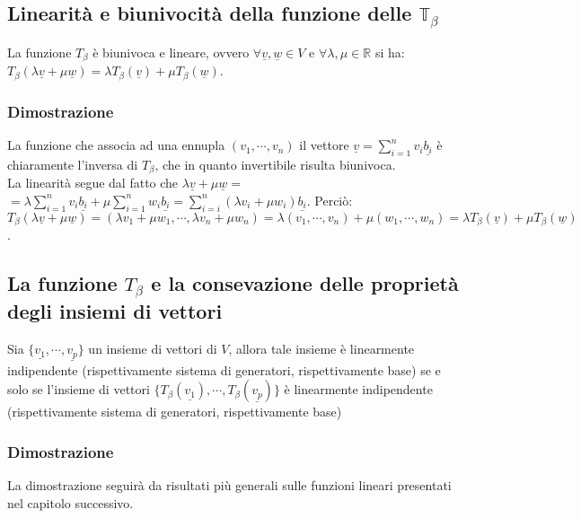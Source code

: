 \subsection{Linearit\`a e biunivocit\`a della funzione delle $\mathbb{T_\beta}$}
La funzione $T_\beta$ \`e biunivoca e lineare, ovvero $\forall\underline{v},\underline{w}\in V$ e $\forall\lambda,\mu\in\mathbb{R}$ si ha: $T_\beta(\lambda\underline{v}+\mu
\underline{w})=\lambda T_\beta(\underline{v})+\mu T_\beta(\underline{w})$. 
\subsubsection{Dimostrazione}
La funzione che associa ad una ennupla $(v_1,\cdots,v_n)$ il vettore $\underline{v}=\sum\limits_{i=1}^n v_i\underline{b_i}$ \`e chiaramente l'inversa di $T_\beta$, che in quanto
invertibile risulta biunivoca.\\
La linearit\`a segue dal fatto che $\lambda\underline{v}+\mu\underline{w}=$\\
$=\lambda\sum\limits_{i=1}^nv_i\underline{b_i}+\mu\sum\limits_{i=1}^nw_i\underline{b_i}=\sum\limits_{i=i}^n(\lambda v_i+\mu w_i)\underline{b_i}$. Perci\`o:\\
$T_\beta(\lambda \underline{v}+\mu\underline{w})=(\lambda v_1+\mu w_1,\cdots,\lambda v_n+\mu w_n)=\lambda(v_1,\cdots,v_n)+\mu(w_1,\cdots,w_n)=\lambda T_\beta(\underline{v})+\mu 
T_\beta(\underline{w})$.
\subsection{La funzione $T_\beta$ e la consevazione delle propriet\`a degli insiemi di vettori}
Sia $\{\underline{v_1},\cdots,\underline{v_p}\}$ un insieme di vettori di $V$, allora tale insieme \`e linearmente indipendente (rispettivamente sistema di generatori, 
rispettivamente base) se e solo se l'insieme di vettori $\{T_\beta(\underline{v_1}),\cdots,T_\beta(\underline{v_p})\}$ \`e linearmente indipendente (rispettivamente sistema di 
generatori, rispettivamente base)
\subsubsection{Dimostrazione}
La dimostrazione seguir\`a da risultati pi\`u generali sulle funzioni lineari presentati nel capitolo successivo.
